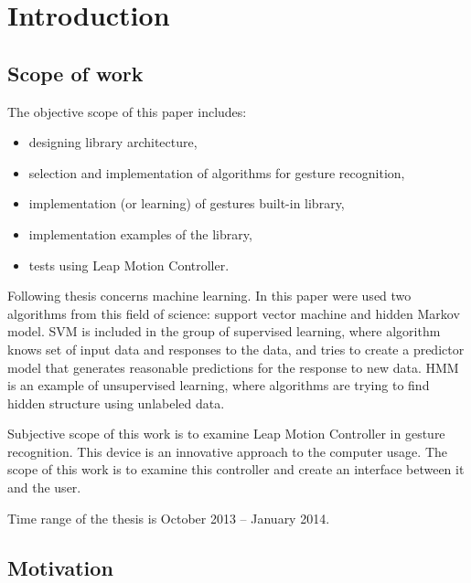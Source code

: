 
\chapter{Introduction}

\section{Scope of work}

The objective scope of this paper includes:
\begin{itemize}
\item designing library architecture, 
\item selection and implementation of algorithms for gesture recognition,
\item implementation (or learning) of gestures built-in library,
\item implementation examples of the library, 
\item tests using Leap Motion Controller.
\end{itemize}
Following thesis concerns machine learning. In this paper were used two algorithms from this field of science: support vector machine and hidden Markov model. SVM is included in the group of supervised learning, where algorithm knows set of input data and responses to the data, and tries to create a predictor model that generates reasonable predictions for the response to new data. HMM is an example of unsupervised learning, where algorithms are trying to find hidden structure using unlabeled data. 

Subjective scope of this work is to examine Leap Motion Controller in gesture recognition. This device is an innovative approach to the computer usage. The scope of this work is to examine this controller and create an interface between it and the user.

Time range of the thesis is October 2013 -- January 2014.


\section{Motivation}

